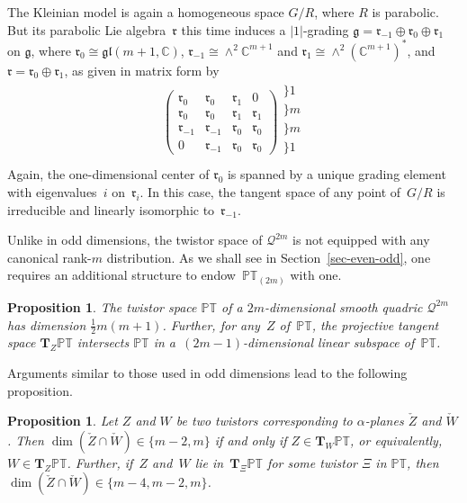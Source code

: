 \documentclass[pdftex]{sigma}
\numberwithin{equation}{section}
\newtheorem{Proposition}[Theorem]{Proposition}
 { \theoremstyle{definition}
\newtheorem{Definition}[Theorem]{Definition}
\newtheorem{Example}[Theorem]{Example}
\newtheorem{Remark}[Theorem]{Remark} }
\newcommand{\mbf} [1]{\mathbf{#1}}
\newcommand{\mc} [1]{\mathcal{#1}}
\newcommand{\glie} {\mathfrak{gl}}
\newcommand{\g} {\mathfrak{g}}
\newcommand{\mfr} {\mathfrak{r}}
\newcommand{\PT} {\mathbb{PT}}
\newcommand{\C} {\mathbb{C}}
\begin{document}
The Kleinian model is again a homogeneous space $G/R$, where $R$ is parabolic. But its parabolic Lie algebra~$\mfr$ this time induces a $|1|$-grading $\g = \mfr_{-1} \oplus \mfr_0 \oplus \mfr_1$ on $\g$, where $\mfr_0 \cong \glie(m+1,\C)$, $\mfr_{-1} \cong \wedge^2 \C^{m+1}$ and $\mfr_1 \cong \wedge^2 (\C^{m+1})^*$, and $\mfr = \mfr_0 \oplus \mfr_1$, as given in matrix form by
\begin{gather*}
\left(
 \begin{array}{c|c|c|c}
\mfr_0 & \mfr_0 & \mfr_1 & 0 \\\hline 
\mfr_0 & \mfr_0 & \mfr_1 & \mfr_1 \\\hline 
\mfr_{-1} & \mfr_{-1} & \mfr_0 & \mfr_0 \\\hline 
0 & \mfr_{-1} & \mfr_0 & \mfr_0
\end{array} \right)
\begin{array}{l}
\} \scriptscriptstyle{1} \\ \} \scriptscriptstyle{m} \\ \} \scriptscriptstyle{m} \\ \} \scriptscriptstyle{1} \\
\end{array}
\end{gather*}
Again, the one-dimensional center of $\mfr_0$ is spanned by a unique grading element with eigenva\-lues~$i$ on~$\mfr_i$. In this case, the tangent space of any point of~$G/R$ is irreducible and linearly isomorphic to~$\mfr_{-1}$.

Unlike in odd dimensions, the twistor space of $\mc{Q}^{2m}$ is not equipped with any canonical \mbox{rank-$m$} distribution. As we shall see in Section~\ref{sec-even-odd}, one requires an additional structure to endow~$\PT_{(2m)}$ with one.

\begin{Proposition}The twistor space $\PT$ of a $2m$-dimensional smooth quadric $\mc{Q}^{2m}$ has dimension $\frac{1}{2}m(m+1)$. Further, for any~$Z$ of~$\PT$, the projective tangent space $\mbf{T}_Z \PT$ intersects $\PT$ in a~$(2m-1)$-dimensional linear subspace of~$\PT$.
\end{Proposition}

Arguments similar to those used in odd dimensions lead to the following proposition.
\begin{Proposition}Let $Z$ and $W$ be two twistors corresponding to $\alpha$-planes $\check{Z}$ and $\check{W}$. Then $\dim ( \check{Z} \cap \check{W} ) \in \{m-2, m \}$ if and only if $Z \in \mbf{T}_W \PT$, or equivalently, $W \in \mbf{T}_Z \PT$. Further, if~$Z$ and~$W$ lie in~$\mbf{T}_\Xi \PT$ for some twistor $\Xi$ in $\PT$, then $\dim ( \check{Z} \cap \check{W}) \in \{m-4, m-2, m \}$.
\end{Proposition}
\end{document}
